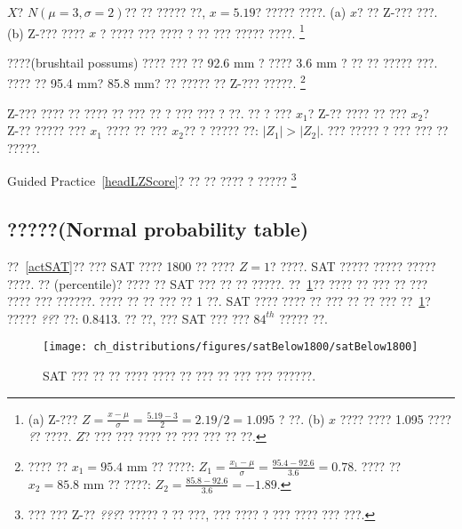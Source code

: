 \begin{exercise}
$X$? $N(\mu=3, \sigma=2)$?? ?? ????? ??, $x=5.19$? ????? ????.
(a) $x$? ?? Z-??? ???. (b) Z-??? ???? $x$ ? ???? ??? ???? ? ?? ??? ????? ????.
\footnote{(a) Z-??? $Z = \frac{x-\mu}{\sigma} = \frac{5.19 - 3}{2} = 2.19/2 = 1.095$ ? ??. 
(b) $x$ ???? ???? 1.095 ???? \emph{?}? ????. $Z$? ??? ??? ???? ?? ??? ??? ?? ??.}
\end{exercise}

\begin{exercise} \label{headLZScore}

????(brushtail possums) ???? ??? ?? 92.6 mm ? ???? 3.6 mm ? ?? ?? ????? ???. ???? ?? 95.4 mm?  85.8 mm? ?? ????? ?? Z-??? ?????. 
\footnote{???? ?? $x_1=95.4$ mm ?? ????: $Z_1 = \frac{x_1 - \mu}{\sigma} = \frac{95.4 - 92.6}{3.6} = 0.78$. ???? ?? $x_2=85.8$ mm ?? ????: $Z_2 = \frac{85.8 - 92.6}{3.6} = -1.89$.}
\end{exercise}

Z-??? ???? ?? ???? ?? ??? ?? ? ??? ??? ? ??. ?? ? ??? $x_1$? Z-?? ???? ?? ??? $x_2$? Z-?? ????? ??? $x_1$ ???? ?? ??? $x_2$?? ? ????? ??: $|Z_1| > |Z_2|$. ??? ????? ? ??? ??? ?? ?????.

\begin{exercise}
Guided Practice~\ref{headLZScore}? ?? ?? ???? ? ?????
\footnote{
??? ??? Z-?? \emph{???}? ????? ? ?? ???, ??? ???? ? ??? ???? ??? ???.}
\end{exercise}

\subsection{?????(Normal probability table)}

\begin{example}{
??~\ref{actSAT}?? ??? SAT ???? 1800 ?? ???? $Z=1$? ????. SAT ????? ????? ????? ????.}
?? (percentile)? ???? ?? SAT ??? ?? ?? ?????. ??~\ref{satBelow1800}?? ???? ?? ??? ?? ??? ???? ??? ??????. ???? ?? ?? ??? ?? 1 ??. SAT ???? ???? ?? ??? ?? ?? ??? ??~\ref{satBelow1800}? ????? \emph{??}? ??: 0.8413. ?? ??, ??? SAT ??? ??? $84^{th}$ ????? ??.
\end{example}

\begin{figure}[htb]
   \centering
   \texttt{[image: ch\_distributions/figures/satBelow1800/satBelow1800]}
   \caption{SAT ??? ?? ?? ???? ???? ?? ??? ?? ??? ??? ??????.}
   \label{satBelow1800}
\end{figure}

